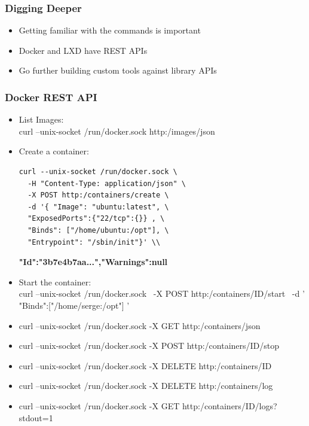 \documentclass{beamer}
\begin{document}
\begin{frame}
\frametitle{Digging Deeper}
\begin{itemize}
\item Getting familiar with the commands is important
\item Docker and LXD have REST APIs
\item Go further building custom tools against library APIs
\end{itemize}
\end{frame}

\begin{frame}[fragile]
\frametitle{Docker REST API}
\begin{itemize}
\item List Images: \\
curl --unix-socket /run/docker.sock http:/images/json
\item Create a container: \\
\begin{lstlisting}
curl --unix-socket /run/docker.sock \
  -H "Content-Type: application/json" \
  -X POST http:/containers/create \
  -d '{ "Image": "ubuntu:latest", \
  "ExposedPorts":{"22/tcp":{}} , \
  "Binds": ["/home/ubuntu:/opt"], \
  "Entrypoint": "/sbin/init"}' \\
\end{lstlisting}
  \vspace{0.25in}
\textbf{ {"Id":"3b7e4b7aa...","Warnings":null} } \\

\item Start the container: \\
curl --unix-socket /run/docker.sock \
  -X POST http:/containers/ID/start \
  -d '{ "Binds":["/home/serge:/opt"] }'
\end{itemize}
\end{frame}

\begin{frame}
\begin{itemize}
\item curl --unix-socket /run/docker.sock -X GET http:/containers/json
\item curl --unix-socket /run/docker.sock -X POST http:/containers/ID/stop
\item curl --unix-socket /run/docker.sock -X DELETE  http:/containers/ID
\item curl --unix-socket /run/docker.sock -X DELETE  http:/containers/log
\item curl --unix-socket /run/docker.sock -X GET http:/containers/ID/logs?stdout=1
\end{itemize}
\end{frame}
\end{document}

